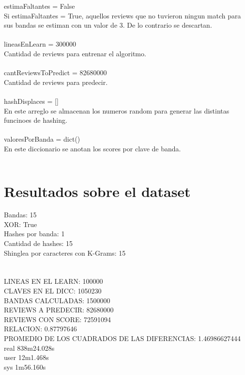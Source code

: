 \documentclass[a4paper,10pt]{article}
\begin{document}
	estimaFaltantes = False \\
	Si estimaFaltantes  = True, aquellos reviews que no tuvieron ningun match para sus bandas se estiman con un valor de 3. De lo contrario se descartan. \\ \\
	
	lineasEnLearn = 300000 \\
	Cantidad de reviews para entrenar el algoritmo. \\ \\

	cantReviewsToPredict = 82680000 \\
	Cantidad de reviews para predecir. \\ \\

	hashDisplaces = [] \\
	En este arreglo se almacenan los numeros random para generar las distintas funcinoes de hashing. \\ \\

	valoresPorBanda = dict() \\
	En este diccionario se anotan los scores por clave de banda. \\ \\

	\section{Resultados sobre el dataset}
	Bandas: 15\\
	XOR: True\\
	Hashes por banda: 1\\
	Cantidad de hashes: 15\\
	Shinglea por caracteres con K-Grams: 15\\\\\\
	
	LINEAS EN EL LEARN: 100000\\
	CLAVES EN EL DICC: 1050230\\
	BANDAS CALCULADAS: 1500000\\
	REVIEWS A PREDECIR: 82680000\\
	REVIEWS CON SCORE: 72591094\\
	RELACION: 0.87797646\\
	PROMEDIO DE LOS CUADRADOS DE LAS DIFERENCIAS: 1.46986627444\\
	real	838m24.028s\\
	user	12m1.468s\\
	sys	1m56.160s\\\\
	
\end{document}
